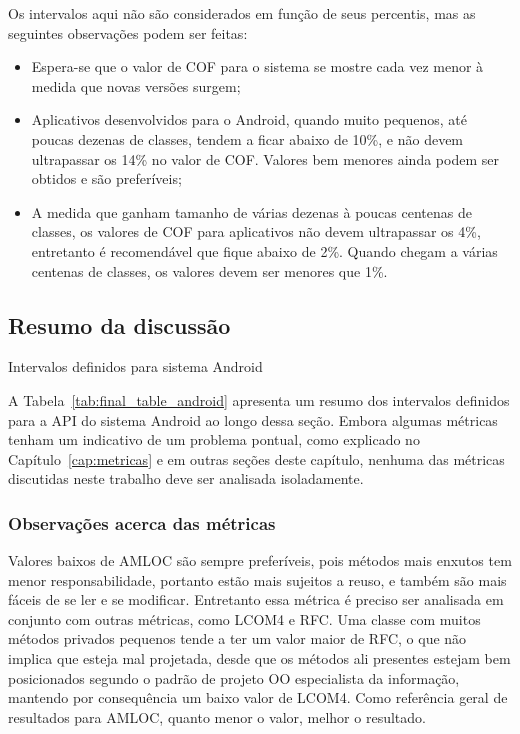 Os intervalos aqui não são considerados em função de seus percentis, mas as seguintes observações podem ser feitas:

\begin{itemize}
\item Espera-se que o valor de COF para o sistema se mostre cada vez menor à medida que novas versões surgem;
\item Aplicativos desenvolvidos para o Android, quando muito pequenos, até poucas dezenas de classes, tendem a ficar abaixo de 10\%, e não devem ultrapassar os 14\% no valor de COF. Valores bem menores ainda podem ser obtidos e são preferíveis;
\item A medida que ganham tamanho de várias dezenas à poucas centenas de classes, os valores de COF para aplicativos não devem ultrapassar os 4\%, entretanto é recomendável que fique abaixo de 2\%. Quando chegam a várias centenas de classes, os valores devem ser menores que 1\%.
\end{itemize}

\subsection{Resumo da discussão}

\begin{table}[!htb]
\centering
{}

\caption{Intervalos definidos para sistema Android}
\label{tab:final_table_android}
\end{table}

A Tabela~\ref{tab:final_table_android} apresenta um resumo dos intervalos definidos para a API do sistema Android ao longo dessa seção. Embora algumas métricas tenham um indicativo de um problema pontual, como explicado no Capítulo~\ref{cap:metricas} e em outras seções deste capítulo, nenhuma das métricas discutidas neste trabalho deve ser analisada isoladamente.

\subsubsection{Observações acerca das métricas}

Valores baixos de AMLOC são sempre preferíveis, pois métodos mais enxutos tem menor responsabilidade, portanto estão mais sujeitos a reuso, e também são mais fáceis de se ler e se modificar. Entretanto essa métrica é preciso ser analisada em conjunto com outras métricas, como LCOM4 e RFC. Uma classe com muitos métodos privados pequenos tende a ter um valor maior de RFC, o que não implica que esteja mal projetada, desde que os métodos ali presentes estejam bem posicionados segundo o padrão de projeto OO especialista da informação, mantendo por consequência um baixo valor de LCOM4. Como referência geral de resultados para AMLOC, quanto menor o valor, melhor o resultado.

